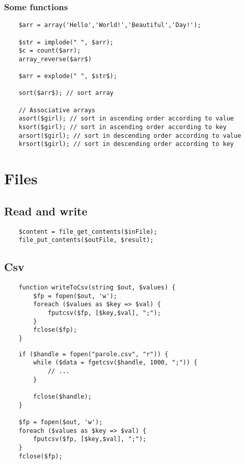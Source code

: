 \documentclass{article}
\begin{document}
\subsubsection{Some functions}

\begin{lstlisting}
    $arr = array('Hello','World!','Beautiful','Day!');
    
    $str = implode(" ", $arr);
    $c = count($arr);
    array_reverse($arr$)

    $arr = explode(" ", $str$);

    sort($arr$); // sort array

    // Associative arrays
    asort($girl); // sort in ascending order according to value
    ksort($girl); // sort in ascending order according to key
    arsort($girl); // sort in descending order according to value
    krsort($girl); // sort in descending order according to key
\end{lstlisting}

\section{Files}

\subsection{Read and write}

\begin{lstlisting}
    $content = file_get_contents($inFile);
    file_put_contents($outFile, $result);
\end{lstlisting}

\subsection{Csv}

\begin{lstlisting}
    function writeToCsv(string $out, $values) {
        $fp = fopen($out, 'w');
        foreach ($values as $key => $val) {
            fputcsv($fp, [$key,$val], ";");
        }
        fclose($fp);
    }
\end{lstlisting}

\begin{lstlisting}
    if ($handle = fopen("parole.csv", "r")) {
        while ($data = fgetcsv($handle, 1000, ";")) {
            // ...
        }
    
        fclose($handle);
    }

    $fp = fopen($out, 'w');
    foreach ($values as $key => $val) {
        fputcsv($fp, [$key,$val], ";");
    }
    fclose($fp);
\end{lstlisting}
\end{document}

